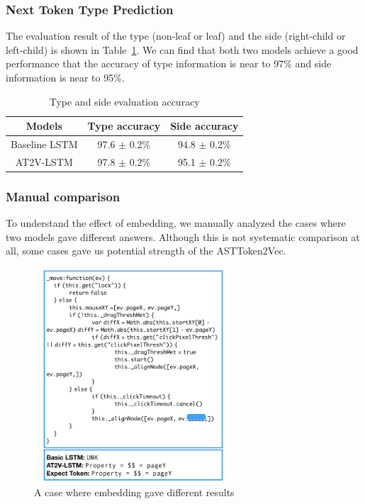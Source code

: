\documentclass[E]{compsoft}
\begin{document}
\subsubsection{Next Token Type Prediction}
The evaluation result of the type (non-leaf or leaf) and the side (right-child or left-child) is shown in  Table~\ref{table:node-information-evaluation-accuracy}.
We can find that both two models achieve a good performance that the accuracy of type information is near to 97\% and side information is near to 95\%. 


\begin{table}
\centering
\begin{tabular}{ccc}
\hline
Models& Type accuracy& Side accuracy\\
\hline
Baseline LSTM& 97.6 $\pm$ 0.2\% & 94.8 $\pm$ 0.2\% \\
AT2V-LSTM& 97.8 $\pm$ 0.2\% & 95.1 $\pm$ 0.2\% \\
\hline
\end{tabular}
\caption{Type and side evaluation accuracy}
\label{table:node-information-evaluation-accuracy}
\end{table}

\subsubsection{Manual comparison}
To understand the effect of embedding, we manually analyzed the cases where two models gave different answers.  Although this is not systematic comparison at all, some cases gave us potential strength of the ASTToken2Vec. %

\begin{figure}[!ht]
\centering
\includegraphics[height=8cm, width=7.4cm]{pictures/code_snippets_compare.png}
\caption{A case where embedding gave different results}
\label{fig:code_snippets_compare}
\end{figure}
\end{document}
